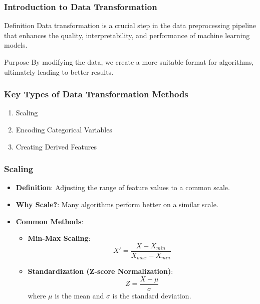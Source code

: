\documentclass[aspectratio=169]{beamer}
\begin{document}
\begin{frame}[fragile]
    \frametitle{Introduction to Data Transformation}
    \begin{block}{Definition}
        Data transformation is a crucial step in the data preprocessing pipeline that enhances the quality, interpretability, and performance of machine learning models.
    \end{block}
    \begin{block}{Purpose}
        By modifying the data, we create a more suitable format for algorithms, ultimately leading to better results.
    \end{block}
\end{frame}

\begin{frame}
    \frametitle{Key Types of Data Transformation Methods}
    \begin{enumerate}
        \item Scaling
        \item Encoding Categorical Variables
        \item Creating Derived Features
    \end{enumerate}
\end{frame}

\begin{frame}
    \frametitle{Scaling}
    \begin{itemize}
        \item \textbf{Definition}: Adjusting the range of feature values to a common scale.
        \item \textbf{Why Scale?}: Many algorithms perform better on a similar scale.
        \item \textbf{Common Methods}:
        \begin{itemize}
            \item \textbf{Min-Max Scaling}:
            \begin{equation}
                X' = \frac{X - X_{min}}{X_{max} - X_{min}}
            \end{equation}
            \item \textbf{Standardization (Z-score Normalization)}:
            \begin{equation}
                Z = \frac{X - \mu}{\sigma}
            \end{equation}
            where \( \mu \) is the mean and \( \sigma \) is the standard deviation.
        \end{itemize}
    \end{itemize}
\end{frame}
\end{document}
